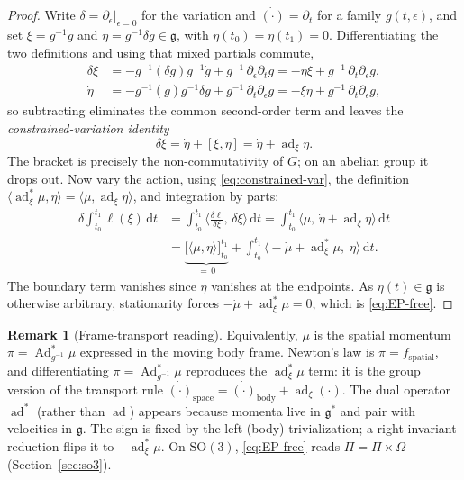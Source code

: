 \documentclass[11pt]{article}
\theoremstyle{plain}
\theoremstyle{definition}
\newtheorem{remark}{Remark}
\newcommand{\g}{\mathfrak{g}}
\newcommand{\gstar}{\mathfrak{g}^{*}}
\newcommand{\SO}{\mathrm{SO}(3)}
\newcommand{\ad}{\operatorname{ad}}
\newcommand{\adstar}{\operatorname{ad}^{*}}
\newcommand{\Adstar}{\operatorname{Ad}^{*}}
\newcommand{\dt}{\,\mathrm{d}t}
\newcommand{\Om}{\Omega}
\newcommand{\inner}[2]{\langle #1,#2\rangle}
\begin{document}
\begin{proof}
Write $\delta=\partial_\epsilon|_{\epsilon=0}$ for the variation and
$\dot{(\cdot)}=\partial_t$ for a family $g(t,\epsilon)$, and set
$\xi=g^{-1}\dot g$ and $\eta=g^{-1}\delta g\in\g$, with $\eta(t_0)=\eta(t_1)=0$.
Differentiating the two definitions and using that mixed partials commute,
\begin{align*}
  \delta\xi &= -g^{-1}(\delta g)g^{-1}\dot g + g^{-1}\,\partial_\epsilon\partial_t g
             = -\eta\xi + g^{-1}\,\partial_t\partial_\epsilon g,\\
  \dot\eta  &= -g^{-1}(\dot g)g^{-1}\delta g + g^{-1}\,\partial_t\partial_\epsilon g
             = -\xi\eta + g^{-1}\,\partial_t\partial_\epsilon g,
\end{align*}
so subtracting eliminates the common second-order term and leaves the
\emph{constrained-variation identity}
\begin{equation}
  \delta\xi=\dot\eta+[\xi,\eta]=\dot\eta+\ad_\xi\eta .
  \label{eq:constrained-var}
\end{equation}
The bracket is precisely the non-commutativity of $G$; on an abelian group it
drops out. Now vary the action, using \eqref{eq:constrained-var}, the definition
$\inner{\adstar_\xi\mu}{\eta}=\inner{\mu}{\ad_\xi\eta}$, and integration by parts:
\begin{align*}
  \delta\!\int_{t_0}^{t_1}\!\ell(\xi)\dt
  &=\int_{t_0}^{t_1}\!\Big\langle \tfrac{\delta\ell}{\delta\xi},\,\delta\xi\Big\rangle\dt
   =\int_{t_0}^{t_1}\!\big\langle \mu,\,\dot\eta+\ad_\xi\eta\big\rangle\dt\\
  &=\underbrace{\big[\inner{\mu}{\eta}\big]_{t_0}^{t_1}}_{=\,0}
   +\int_{t_0}^{t_1}\!\big\langle -\dot\mu+\adstar_\xi\mu,\;\eta\big\rangle\dt .
\end{align*}
The boundary term vanishes since $\eta$ vanishes at the endpoints. As $\eta(t)\in\g$
is otherwise arbitrary, stationarity forces $-\dot\mu+\adstar_\xi\mu=0$, which is
\eqref{eq:EP-free}.
\end{proof}

\begin{remark}[Frame-transport reading]
Equivalently, $\mu$ is the spatial momentum $\pi=\Adstar_{g^{-1}}\mu$ expressed in
the moving body frame. Newton's law is $\dot\pi=f_{\mathrm{spatial}}$, and
differentiating $\pi=\Adstar_{g^{-1}}\mu$ reproduces the $\adstar_\xi\mu$ term:
it is the group version of the transport rule
$\dot{(\cdot)}_{\mathrm{space}}=\dot{(\cdot)}_{\mathrm{body}}+\ad_\xi(\cdot)$. The
dual operator $\adstar$ (rather than $\ad$) appears because momenta live in
$\gstar$ and pair with velocities in $\g$. The sign is fixed by the left (body)
trivialization; a right-invariant reduction flips it to $-\adstar_\xi\mu$. On
$\SO$, \eqref{eq:EP-free} reads $\dot\Pi=\Pi\times\Om$ (Section~\ref{sec:so3}).
\end{remark}
\end{document}
